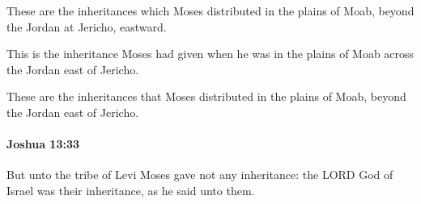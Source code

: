 			\begin{versebox}
					\item[BHS] 
					\item[ASV] These are the inheritances which Moses distributed in the plains of Moab, beyond the Jordan at Jericho, eastward.
					\item[NIV] This is the inheritance Moses had given when he was in the plains of Moab across the Jordan east of Jericho.
					\item[NRSV] These are the inheritances that Moses distributed in the plains of Moab, beyond the Jordan east of Jericho.
			\end{versebox}

		\paragraph{Joshua 13:33} %
			\label{JOSHUA-13-33}

			But unto the tribe of Levi Moses gave not any inheritance: the LORD God of Israel was their inheritance, as he said unto them.

